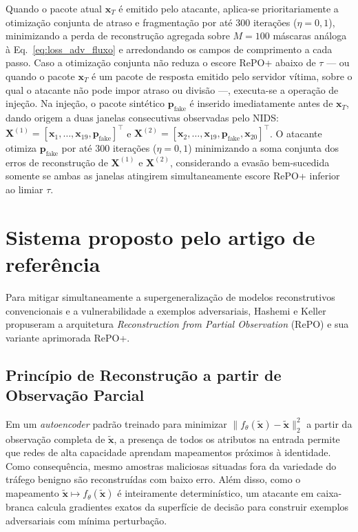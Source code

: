 \documentclass[conference]{IEEEtran}
\begin{document}
Quando o pacote atual $\mathbf{x}_T$ é emitido pelo atacante, aplica-se prioritariamente a otimização conjunta de atraso e fragmentação por até $300$ iterações ($\eta = 0{,}1$), minimizando a perda de reconstrução agregada sobre $M = 100$ máscaras análoga à Eq.~\eqref{eq:loss_adv_fluxo} e arredondando os campos de comprimento a cada passo.
Caso a otimização conjunta não reduza o escore RePO+ abaixo de $\tau$ — ou quando o pacote $\mathbf{x}_T$ é um pacote de resposta emitido pelo servidor vítima, sobre o qual o atacante não pode impor atraso ou divisão —, executa-se a operação de injeção.
Na injeção, o pacote sintético $\mathbf{p}_{\text{fake}}$ é inserido imediatamente antes de $\mathbf{x}_T$, dando origem a duas janelas consecutivas observadas pelo NIDS: $\mathbf{X}^{(1)} = [\mathbf{x}_1, \dots, \mathbf{x}_{19}, \mathbf{p}_{\text{fake}}]^{\top}$ e $\mathbf{X}^{(2)} = [\mathbf{x}_2, \dots, \mathbf{x}_{19}, \mathbf{p}_{\text{fake}}, \mathbf{x}_{20}]^{\top}$.
O atacante otimiza $\mathbf{p}_{\text{fake}}$ por até $300$ iterações ($\eta = 0{,}1$) minimizando a soma conjunta dos erros de reconstrução de $\mathbf{X}^{(1)}$ e $\mathbf{X}^{(2)}$, considerando a evasão bem-sucedida somente se ambas as janelas atingirem simultaneamente escore RePO+ inferior ao limiar $\tau$.

\section{Sistema proposto pelo artigo de referência}\label{sec:sistema_referencia}

Para mitigar simultaneamente a supergeneralização de modelos reconstrutivos convencionais e a vulnerabilidade a exemplos adversariais, Hashemi e Keller \cite{hashemi2020} propuseram a arquitetura \textit{Reconstruction from Partial Observation} (RePO) e sua variante aprimorada RePO+.

\subsection{Princípio de Reconstrução a partir de Observação Parcial}

Em um \textit{autoencoder} padrão treinado para minimizar $\|f_{\theta}(\tilde{\mathbf{x}}) - \tilde{\mathbf{x}}\|_2^2$ a partir da observação completa de $\tilde{\mathbf{x}}$, a presença de todos os atributos na entrada permite que redes de alta capacidade aprendam mapeamentos próximos à identidade.
Como consequência, mesmo amostras maliciosas situadas fora da variedade do tráfego benigno são reconstruídas com baixo erro.
Além disso, como o mapeamento $\tilde{\mathbf{x}} \mapsto f_{\theta}(\tilde{\mathbf{x}})$ é inteiramente determinístico, um atacante em caixa-branca calcula gradientes exatos da superfície de decisão para construir exemplos adversariais com mínima perturbação.
\end{document}
